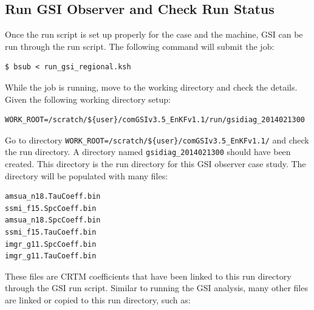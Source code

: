 \subsection{Run GSI Observer and Check Run Status}

Once the run script is set up properly for the case and the machine, GSI can be run through the run script. The following command will submit the job:
\begin{small}
\begin{verbatim}
$ bsub < run_gsi_regional.ksh
\end{verbatim}
\end{small}

While the job is running, move to the working directory and check the details. Given the following working directory setup:

\begin{small}
\begin{verbatim}
WORK_ROOT=/scratch/${user}/comGSIv3.5_EnKFv1.1/run/gsidiag_2014021300
\end{verbatim}
\end{small}

Go to directory \verb|WORK_ROOT=/scratch/${user}/comGSIv3.5_EnKFv1.1/| and check the run directory. A directory named \verb|gsidiag_2014021300| should have been created. This directory is the run directory for this GSI observer case study. The directory will be populated with many files:

\begin{footnotesize}
\begin{verbatim}
amsua_n18.TauCoeff.bin 
ssmi_f15.SpcCoeff.bin 
amsua_n18.SpcCoeff.bin 
ssmi_f15.TauCoeff.bin 
imgr_g11.SpcCoeff.bin
imgr_g11.TauCoeff.bin
\end{verbatim}
\end{footnotesize}

These files are CRTM coefficients that have been linked to this run directory through the GSI run script. Similar to running the GSI analysis, many other files are linked or copied to this run directory, such as:

